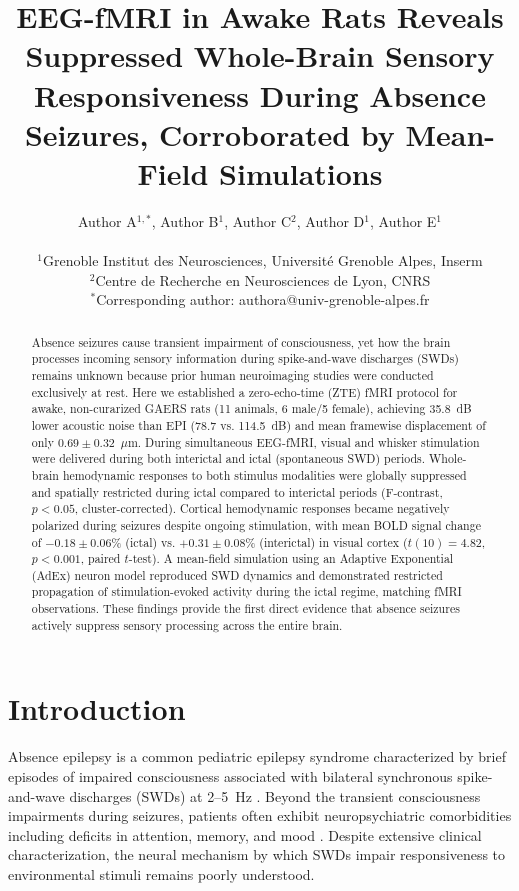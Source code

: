\documentclass[11pt]{article}
\title{EEG-fMRI in Awake Rats Reveals Suppressed Whole-Brain Sensory Responsiveness During Absence Seizures, Corroborated by Mean-Field Simulations}
\author{
Author A$^{1,*}$, Author B$^{1}$, Author C$^{2}$, Author D$^{1}$, Author E$^{1}$ \\
\\
$^{1}$Grenoble Institut des Neurosciences, Universit\'{e} Grenoble Alpes, Inserm \\
$^{2}$Centre de Recherche en Neurosciences de Lyon, CNRS \\
$^{*}$Corresponding author: authora@univ-grenoble-alpes.fr
}
\date{}
\begin{document}
\maketitle

\begin{abstract}
Absence seizures cause transient impairment of consciousness, yet how the brain processes incoming sensory information during spike-and-wave discharges (SWDs) remains unknown because prior human neuroimaging studies were conducted exclusively at rest. Here we established a zero-echo-time (ZTE) fMRI protocol for awake, non-curarized GAERS rats (11 animals, 6 male/5 female), achieving 35.8~dB lower acoustic noise than EPI (78.7 vs. 114.5~dB) and mean framewise displacement of only $0.69 \pm 0.32$~$\mu$m. During simultaneous EEG-fMRI, visual and whisker stimulation were delivered during both interictal and ictal (spontaneous SWD) periods. Whole-brain hemodynamic responses to both stimulus modalities were globally suppressed and spatially restricted during ictal compared to interictal periods (F-contrast, $p < 0.05$, cluster-corrected). Cortical hemodynamic responses became negatively polarized during seizures despite ongoing stimulation, with mean BOLD signal change of $-0.18 \pm 0.06$\% (ictal) vs. $+0.31 \pm 0.08$\% (interictal) in visual cortex ($t(10) = 4.82$, $p < 0.001$, paired $t$-test). A mean-field simulation using an Adaptive Exponential (AdEx) neuron model reproduced SWD dynamics and demonstrated restricted propagation of stimulation-evoked activity during the ictal regime, matching fMRI observations. These findings provide the first direct evidence that absence seizures actively suppress sensory processing across the entire brain.
\end{abstract}

\section{Introduction}

Absence epilepsy is a common pediatric epilepsy syndrome characterized by brief episodes of impaired consciousness associated with bilateral synchronous spike-and-wave discharges (SWDs) at 2--5~Hz \citep{panayiotopoulos2008typical}. Beyond the transient consciousness impairments during seizures, patients often exhibit neuropsychiatric comorbidities including deficits in attention, memory, and mood \citep{blumenfeld2005consciousness, mccarthy2015attention}. Despite extensive clinical characterization, the neural mechanism by which SWDs impair responsiveness to environmental stimuli remains poorly understood.
\end{document}
